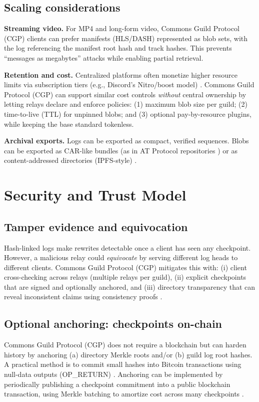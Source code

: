 \documentclass[conference]{IEEEtran}
\newcommand{\cgp}{Commons Guild Protocol (CGP)\xspace}
\newcommand{\atproto}{AT Protocol\xspace}
\begin{document}
\subsection{Scaling considerations}
\textbf{Streaming video.} For MP4 and long-form video, \cgp clients can prefer manifests (HLS/DASH) represented as blob sets, with the log referencing the manifest root hash and track hashes. This prevents ``messages as megabytes'' attacks while enabling partial retrieval.

\textbf{Retention and cost.} Centralized platforms often monetize higher resource limits via subscription tiers (e.g., Discord’s Nitro/boost model) \cite{robinson2022yeet}. \cgp can support similar cost controls \emph{without} central ownership by letting relays declare and enforce policies: (1) maximum blob size per guild; (2) time-to-live (TTL) for unpinned blobs; and (3) optional pay-by-resource plugins, while keeping the base standard tokenless.

\textbf{Archival exports.} Logs can be exported as compact, verified sequences. Blobs can be exported as CAR-like bundles (as in \atproto repositories \cite{atprotoRepoSpec}) or as content-addressed directories (IPFS-style) \cite{ipfs}.

\section{Security and Trust Model}
\subsection{Tamper evidence and equivocation}
Hash-linked logs make rewrites detectable once a client has seen any checkpoint. However, a malicious relay could \emph{equivocate} by serving different log heads to different clients. \cgp mitigates this with: (i) client cross-checking across relays (multiple relays per guild), (ii) explicit checkpoints that are signed and optionally anchored, and (iii) directory transparency that can reveal inconsistent claims using consistency proofs \cite{rfc6962}.

\subsection{Optional anchoring: checkpoints on-chain}
\cgp does not require a blockchain but can harden history by anchoring (a) directory Merkle roots and/or (b) guild log root hashes. A practical method is to commit small hashes into Bitcoin transactions using null-data outputs (OP\_RETURN) \cite{nakamoto2008bitcoin}. Anchoring can be implemented by periodically publishing a checkpoint commitment into a public blockchain transaction, using Merkle batching to amortize cost across many checkpoints \cite{haber1991timestamping,merkle1987,nakamoto2008bitcoin}.
\end{document}
